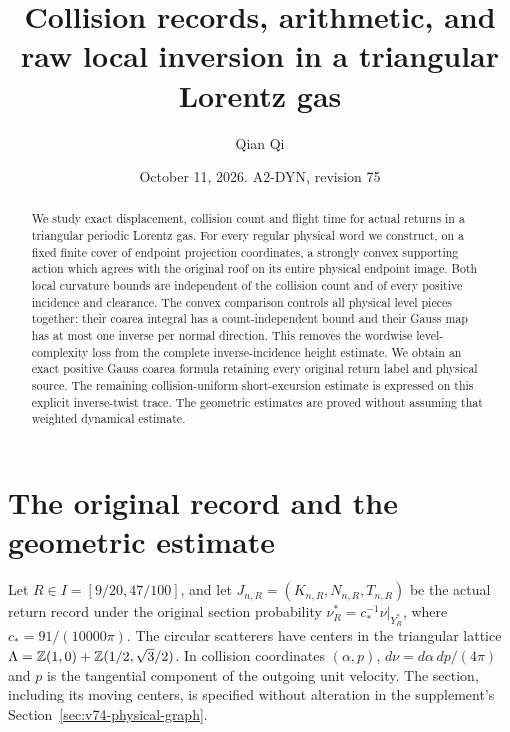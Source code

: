 \documentclass[11pt,reqno]{amsart}
\title[Collision records and raw local inversion]{Collision records, arithmetic, and raw local inversion in a triangular Lorentz gas}
\author{Qian Qi}
\date{October 11, 2026. A2-DYN, revision 75}
\numberwithin{equation}{section}
\theoremstyle{definition}
\theoremstyle{remark}\newtheorem{remark}[theorem]{Remark}
\begin{document}
\raggedbottom
\begin{abstract}
We study exact displacement, collision count and flight time for actual
returns in a triangular periodic Lorentz gas. For every regular physical
word we construct, on a fixed finite cover of endpoint projection
coordinates, a strongly convex supporting action which agrees with the
original roof on its entire physical endpoint image. Both local curvature
bounds are independent of the collision count and of every positive
incidence and clearance. The convex comparison controls all physical
level pieces together: their coarea integral has a count-independent
bound and their Gauss map has at most one inverse per normal direction.
This removes the wordwise level-complexity loss from the complete
inverse-incidence height estimate. We obtain an exact positive Gauss
coarea formula retaining every original return label and physical source.
The remaining collision-uniform short-excursion estimate is expressed
on this explicit inverse-twist trace. The geometric estimates are proved
without assuming that weighted dynamical estimate.
\end{abstract}
\maketitle

\section{The original record and the geometric estimate}
\label{sec:v75-introduction}
Let $R\in I=[9/20,47/100]$, and let
$J_{n,R}=(K_{n,R},N_{n,R},T_{n,R})$ be the actual return record
under the original section probability
$\nu_R^*=c_*^{-1}\nu|_{Y_R^*}$, where $c_*=91/(10000\pi)$.
The circular scatterers have centers in the triangular lattice
$\Lambda=\mathbb Z(1,0)+\mathbb Z(1/2,\sqrt3/2)$. In collision coordinates
$(\alpha,p)$, $d\nu=d\alpha\,dp/(4\pi)$ and $p$ is the tangential
component of the outgoing unit velocity. The section, including its
moving centers, is specified without alteration in the supplement's
Section~\ref{sec:v74-physical-graph}.
\end{document}
